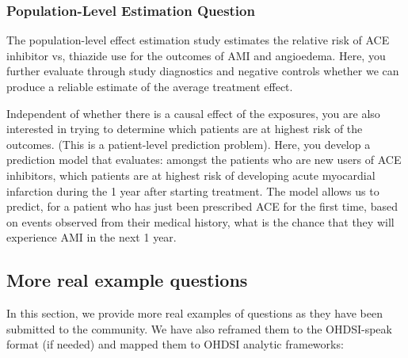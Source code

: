 \documentclass[11pt]{book}
\theoremstyle{definition}
\theoremstyle{definition}
\theoremstyle{definition}
\theoremstyle{remark}
\begin{document}
\hypertarget{population-level-estimation-question}{%
\subsubsection{Population-Level Estimation Question}\label{population-level-estimation-question}}

The population-level effect estimation study estimates the relative risk of ACE inhibitor vs, thiazide use for the outcomes of AMI and angioedema. Here, you further evaluate through study diagnostics and negative controls whether we can produce a reliable estimate of the average treatment effect.

Independent of whether there is a causal effect of the exposures, you are also interested in trying to determine which patients are at highest risk of the outcomes. (This is a patient-level prediction problem). Here, you develop a prediction model that evaluates: amongst the patients who are new users of ACE inhibitors, which patients are at highest risk of developing acute myocardial infarction during the 1 year after starting treatment. The model allows us to predict, for a patient who has just been prescribed ACE for the first time, based on events observed from their medical history, what is the chance that they will experience AMI in the next 1 year.

\hypertarget{more-real-example-questions}{%
\subsection{More real example questions}\label{more-real-example-questions}}

In this section, we provide more real examples of questions as they have been submitted to the community. We have also reframed them to the OHDSI-speak format (if needed) and mapped them to OHDSI analytic frameworks:
\end{document}
